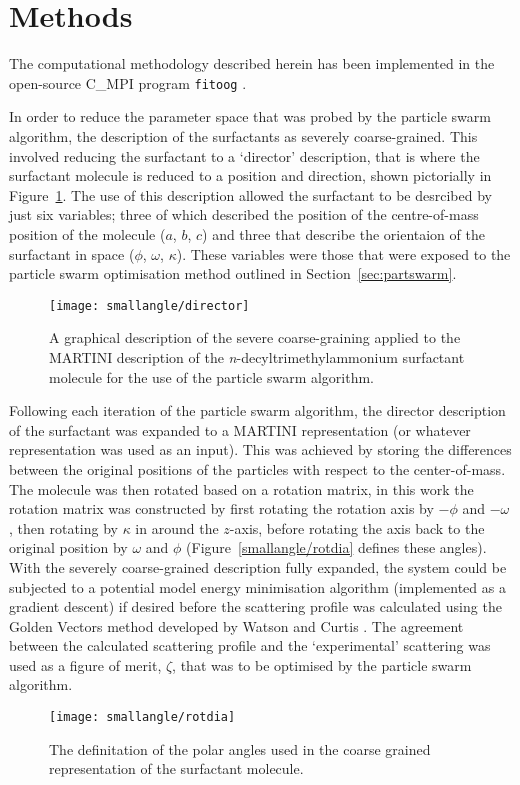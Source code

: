 \section{Methods}

The computational methodology described herein has been implemented in the open-source C\_MPI program \texttt{fitoog} \cite{mccluskey_arm61/fitoog_2019}.

In order to reduce the parameter space that was probed by the particle swarm algorithm, the description of the surfactants as severely coarse-grained.
This involved reducing the surfactant to a `director' description, that is where the surfactant molecule is reduced to a position and direction, shown pictorially in Figure~\ref{fig:director}.
The use of this description allowed the surfactant to be desrcibed by just six variables; three of which described the position of the centre-of-mass position of the molecule ($a$, $b$, $c$) and three that describe the orientaion of the surfactant in space ($\phi$, $\omega$, $\kappa$).
These variables were those that were exposed to the particle swarm optimisation method outlined in Section~\ref{sec:partswarm}.
%
\begin{figure}
    \centering
    \texttt{[image: smallangle/director]}
    \caption{A graphical description of the severe coarse-graining applied to the MARTINI description of the \emph{n}-decyltrimethylammonium surfactant molecule for the use of the particle swarm algorithm.}
    \label{fig:director}
\end{figure}
%

Following each iteration of the particle swarm algorithm, the director description of the surfactant was expanded to a MARTINI representation (or whatever representation was used as an input).
This was achieved by storing the differences between the original positions of the particles with respect to the center-of-mass.
The molecule was then rotated based on a rotation matrix, in this work the rotation matrix was constructed by first rotating the rotation axis by $-\phi$ and $-\omega$, then rotating by $\kappa$ in around the $z$-axis, before rotating the axis back to the original position by $\omega$ and $\phi$ \cite{evans_rotations_2001} (Figure~\ref{smallangle/rotdia} defines these angles).
With the severely coarse-grained description fully expanded, the system could be subjected to a potential model energy minimisation algorithm (implemented as a gradient descent) if desired before the scattering profile was calculated using the Golden Vectors method developed by Watson and Curtis \cite{watson_rapid_2013}.
The agreement between the calculated scattering profile and the `experimental' scattering was used as a figure of merit, $\zeta$, that was to be optimised by the particle swarm algorithm. 
%
\begin{figure}
    \centering
    \texttt{[image: smallangle/rotdia]}
    \caption{The definitation of the polar angles used in the coarse grained representation of the surfactant molecule.}
    \label{fig:rot}
\end{figure}
%
